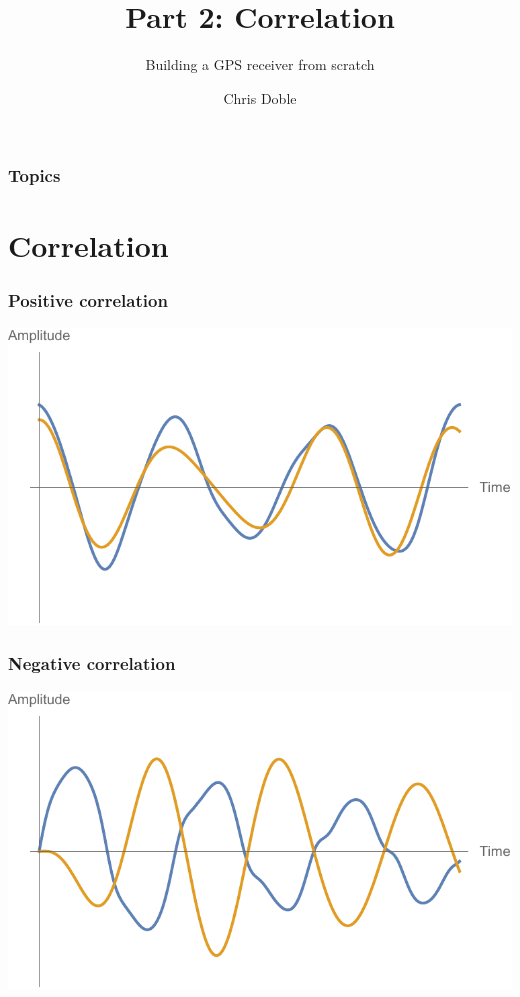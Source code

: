 \documentclass{beamer}
\author{Chris Doble}
\date{}
\subtitle{Building a GPS receiver from scratch}
\title{Part 2: Correlation}
\begin{document}
\frame{\titlepage}

\begin{frame}
    \frametitle{Topics}

    \tableofcontents
\end{frame}

\section{Correlation}

\begin{frame}
    \frametitle{Positive correlation}

    \includegraphics[width=\textwidth]{1 positive.pdf}
\end{frame}

\begin{frame}
    \frametitle{Negative correlation}

    \includegraphics[width=\textwidth]{2 negative.pdf}
\end{frame}
\end{document}
